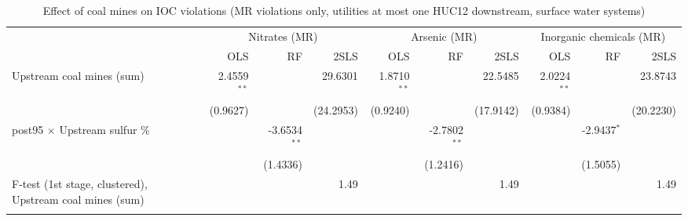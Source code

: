 
\begin{table}[htbp]
   
   \caption{\label{2sls_dwnstrm_minevio_mr_ivsum_binvio_surfacewater} Effect of coal mines on IOC violations (MR violations only, utilities at most one HUC12 downstream, surface water systems)}
   \bigskip
   
   \centering
   
   \begin{adjustbox}{width = \textwidth, center}
      
      
      \begin{tabular}{lrrrrrrrrr}
         \toprule
         
          & \multicolumn{3}{c}{Nitrates (MR)} & \multicolumn{3}{c}{Arsenic (MR)} & \multicolumn{3}{c}{Inorganic chemicals (MR)}\\
         
                                                                  & OLS           & RF             & 2SLS      & OLS           & RF             & 2SLS      & OLS           & RF            & 2SLS\\  
         
         \midrule 
         Upstream coal mines (sum)                                & 2.4559$^{**}$ &                & 29.6301   & 1.8710$^{**}$ &                & 22.5485   & 2.0224$^{**}$ &               & 23.8743\\   
                                                                  & (0.9627)      &                & (24.2953) & (0.9240)      &                & (17.9142) & (0.9384)      &               & (20.2230)\\   
         post95 $\times$ Upstream sulfur \%                       &               & -3.6534$^{**}$ &           &               & -2.7802$^{**}$ &           &               & -2.9437$^{*}$ &   \\   
                                                                  &               & (1.4336)       &           &               & (1.2416)       &           &               & (1.5055)      &   \\   
         
         F-test (1st stage, clustered), Upstream coal mines (sum) &               &                & 1.49      &               &                & 1.49      &               &               & 1.49\\  
         
          \\
         

\end{tabular}
\end{adjustbox}
\end{table}
